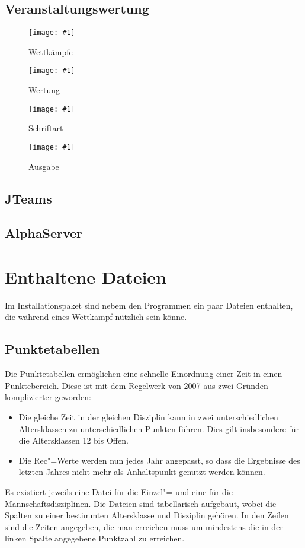 \documentclass[11pt,a4paper,twoside,ngerman]{article}
\newcommand{\hsmimage}[3]{\begin{figure}[!ht]\centering\texttt{[image: \#1]}\caption{#3}\end{figure}}
\begin{document}
\newpage

\subsection{Veranstaltungswertung}
\label{lbl:veranstaltungswertung::begin}

\hsmimage{pics/veranstaltungswertung-wettkaempfe}{.70\textwidth}{Wettkämpfe}

\hsmimage{pics/veranstaltungswertung-gesamtwertung}{.70\textwidth}{Wertung}

\hsmimage{pics/veranstaltungswertung-schriftart}{.70\textwidth}{Schriftart}

\hsmimage{pics/veranstaltungswertung-ausgabe}{.70\textwidth}{Ausgabe}

\newpage

\subsection{JTeams}
\label{lbl:JTeams::begin}

\newpage

\subsection{AlphaServer}
\label{lbl:alphaserver::begin}

\newpage

\section{Enthaltene Dateien}
\label{lbl:Dateien::begin}
\label{lbl:Dateien:veranstaltungswertung}Im Installationspaket sind nebem den Programmen ein paar Dateien enthalten, die während eines Wettkampf nützlich sein könne.


\newpage

\subsection{Punktetabellen}
\label{lbl:punktetabellen::begin}
Die Punktetabellen ermöglichen eine schnelle Einordnung einer Zeit in einen Punktebereich. Diese ist mit dem Regelwerk von 2007 aus zwei Gründen komplizierter geworden:


\begin{itemize}

\item Die gleiche Zeit in der gleichen Disziplin kann in zwei unterschiedlichen Altersklassen zu unterschiedlichen Punkten führen. Dies gilt insbesondere für die Altersklassen 12 bis Offen.


\item Die Rec"=Werte werden nun jedes Jahr angepasst, so dass die Ergebnisse des letzten Jahres nicht mehr als Anhaltspunkt genutzt werden können.


\end{itemize}
Es existiert jeweils eine Datei für die Einzel"= und eine für die Mannschaftsdisziplinen. Die Dateien sind tabellarisch aufgebaut, wobei die Spalten zu einer bestimmten Altersklasse und Disziplin gehören. In den Zeilen sind die Zeiten angegeben, die man erreichen muss um mindestens die in der linken Spalte angegebene Punktzahl zu erreichen.
\end{document}
